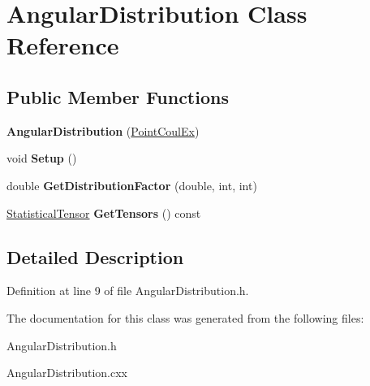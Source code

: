 \hypertarget{classAngularDistribution}{\section{Angular\-Distribution Class Reference}
\label{classAngularDistribution}
}
\subsection*{Public Member Functions}
\begin{DoxyCompactItemize}
\item 
\hypertarget{classAngularDistribution_a56c2d8f896d40e157c42a99dc1ee2f60}{{\bfseries Angular\-Distribution} (\hyperlink{classPointCoulEx}{Point\-Coul\-Ex})}\label{classAngularDistribution_a56c2d8f896d40e157c42a99dc1ee2f60}

\item 
\hypertarget{classAngularDistribution_ace9b52693a74aa2877b13dcec105ca6f}{void {\bfseries Setup} ()}\label{classAngularDistribution_ace9b52693a74aa2877b13dcec105ca6f}

\item 
\hypertarget{classAngularDistribution_aca16962a43be6c419a0278655b28ef2f}{double {\bfseries Get\-Distribution\-Factor} (double, int, int)}\label{classAngularDistribution_aca16962a43be6c419a0278655b28ef2f}

\item 
\hypertarget{classAngularDistribution_afd6611b6f80caea42ee36c52deb74ece}{\hyperlink{classStatisticalTensor}{Statistical\-Tensor} {\bfseries Get\-Tensors} () const }\label{classAngularDistribution_afd6611b6f80caea42ee36c52deb74ece}

\end{DoxyCompactItemize}


\subsection{Detailed Description}


Definition at line 9 of file Angular\-Distribution.\-h.



The documentation for this class was generated from the following files\-:\begin{DoxyCompactItemize}
\item 
Angular\-Distribution.\-h\item 
Angular\-Distribution.\-cxx\end{DoxyCompactItemize}
